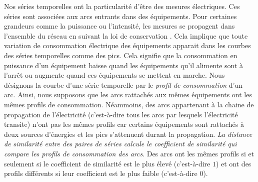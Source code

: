 Nos s\'eries temporelles ont la particularit\'e d'\^etre des mesures \'electriques. Ces s\'eries sont associ\'ees aux arcs entrants dans des \'equipements. Pour certaines grandeurs comme la puissance ou l'intensit\'e, les mesures se propagent dans l'ensemble du r\'eseau en suivant la loi de conservation \cite{loiDeConservation}. 
Cela implique que toute variation de consommation \'electrique des \'equipements apparait dans les courbes des s\'eries temporelles comme des pics. Cela signifie que la consommation en puissance d'un \'equipement
 baisse quand les \'equipements qu'il alimente sont \`a l'arr\^et ou 
 augmente quand ces \'equipements se mettent en marche.
Nous d\'esignons la courbe d'une s\'erie temporelle par le {\em profil de consommation} d'un arc. 
Ainsi, nous supposons que les arcs rattach\'es aux m\^emes \'equipements ont les m\^emes profils de consommation.
N\'eammoins, des arcs appartenant \`a la chaine de propagation de l'\'electricit\'e (c'est-\`a-dire tous les arcs par lesquels l'\'electricit\'e transite) n'ont pas les m\^emes profils car certains \'equipements sont rattach\'es \`a deux sources d'\'energies et les pics s'attenuent durant la propagation.
{\em La distance de similarit\'e entre des paires de s\'eries calcule le coefficient de similarit\'e qui compare les profils de consommation des arcs}. Des arcs ont les m\^emes profils  si et seulement si le coefficient de similarit\'e est le plus \'elev\'e (c'est-\`a-dire $1$) et ont des profils diff\'erents si  leur coefficient est le plus faible (c'est-\`a-dire $0$).
\newline

